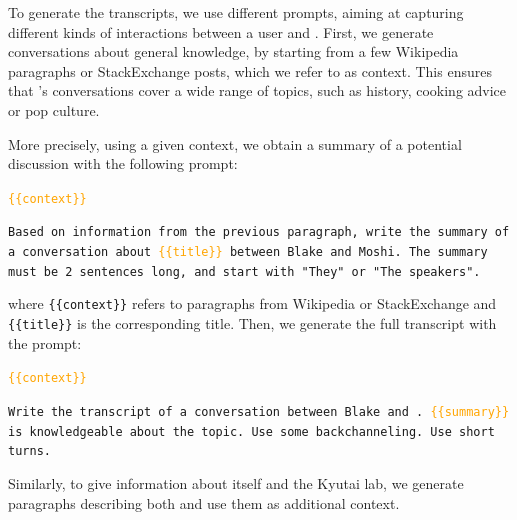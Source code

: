 To generate the transcripts, we use different prompts, aiming at capturing different kinds of interactions between a user and \ours{}.
First, we generate conversations about general knowledge, by starting from a few Wikipedia paragraphs or StackExchange posts, which we refer to as context.
This ensures that \ours{}'s conversations cover a wide range of topics, such as history, cooking advice or pop culture.

More precisely, using a given context, we obtain a summary of a potential discussion with the following prompt:
\begin{tcolorbox}
  \texttt{\textcolor{orange}{\{\{context\}\}}}
  
  \vspace{1em}
  \texttt{Based on information from the previous paragraph, write the summary of a conversation about \textcolor{orange}{\{\{title\}\}} between Blake and Moshi. The summary must be 2 sentences long, and start with "They" or "The speakers".}
\end{tcolorbox}

\noindent where \texttt{\{\{context\}\}} refers to paragraphs from Wikipedia or StackExchange and \texttt{\{\{title\}\}} is the corresponding title.
Then, we generate the full transcript with the prompt:
\begin{tcolorbox}
  \texttt{\textcolor{orange}{\{\{context\}\}}}

  \vspace{1em}
  \texttt{Write the transcript of a conversation between Blake and  \ours{}. \textcolor{orange}{\{\{summary\}\}} \ours{} is knowledgeable about the topic. Use some backchanneling. Use short turns.}
\end{tcolorbox}
Similarly, to give \ours{} information about itself and the Kyutai lab, we generate paragraphs describing both and use them as additional context.

